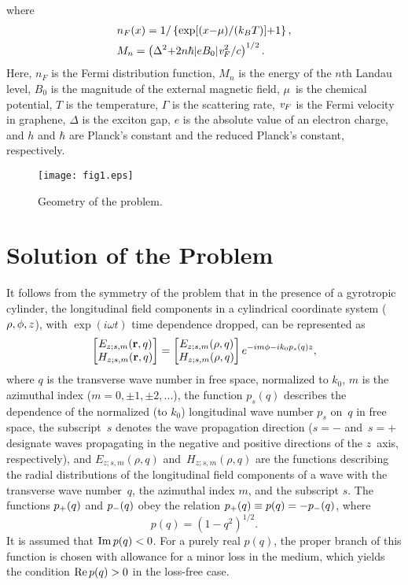 \documentclass[conference,a4paper]{IEEEtran}
\begin{document}
where
\begin{align}
&{n_F}(x) = 1/\left\{\exp [(x{-}\mu )/({k_B}T)]{+}1\right\},\nonumber\\
&{M_n} = \left({\Delta ^2}{+}2n\hbar |e{B_0}|{\it v}_F^{\rm{2}}{\rm{/}}c\right)^{1/2}\nonumber.
\end{align}
Here, $n_F$ is the Fermi distribution function, $M_n$ is the energy of the $n$th Landau level, $B_0$ is the magnitude of the external magnetic field, $\mu$~is the chemical potential, $T$ is the temperature, $\Gamma$ is the scattering rate, ${\it v}_F$ is the Fermi velocity in graphene, $\Delta$ is the exciton gap, $e$ is the absolute value of an electron charge, and $h$ and $\hbar$ are Planck's constant and the reduced Planck's constant, respectively.

\begin{figure}[h]
	\texttt{[image: fig1.eps]}
	\caption{Geometry of the problem.} \label{fig1}
\end{figure}

\section{Solution of the Problem}

It follows from the symmetry of the problem that in the presence of a gyrotropic cylinder, the longitudinal field components in a cylindrical coordinate system ($\rho,\phi,z$), with $\exp({i}\omega t)$ time dependence dropped, can be represented as
\begin{equation}\label{eq5}
\begin{bmatrix} {E}_{z;s,m}({\bf r},q)\\ {	H}_{z;s,m}({\bf r},q)\end{bmatrix} = \begin{bmatrix} {E}_{z;s,m}(\rho, q)\\ {H}_{z;s,m}(\rho, q)\end{bmatrix}e^{-i m\phi - i k_0
	p_{s}(q)z},
\end{equation}
where $q$ is the transverse wave number in free space, normalized to $k_0$, $m$ is the azimuthal index ($m=0, \pm 1, \pm 2, ...$), the function $p_{s}(q)$ describes the dependence of the normalized (to $k_0$) longitudinal wave number $p_s$ on~$q$ in free space, the subscript~$s$ denotes the wave propagation
direction ($s=-$ and~$s=+$ designate waves propagating in the negative and positive directions of the $z$~axis, respectively), and ${E}_{z;s,m}(\rho, q)$ and~${H}_{z;s,m}(\rho, q)$ are
the functions describing the radial distributions of the longitudinal field components of a wave with the transverse wave number~$q$, the azimuthal index $m$, and the subscript $s$. The functions $p_{\rm +}(q)$ and $p_{\rm -}(q)$ obey the
relation $p_{\rm +}(q)\equiv p(q)= -p_{\rm -}(q)$, where
\begin{equation}\label{eq6}
p(q)=\left(1-q^2\right)^{1/2}.
\end{equation}
It is assumed that ${\rm Im}\,p(q)<0$. For a purely real $p(q)$, the proper branch of this function is chosen with allowance for a minor loss in the medium, which yields the condition ${\rm Re}\,p(q)>0$ in the loss-free case.
\end{document}
